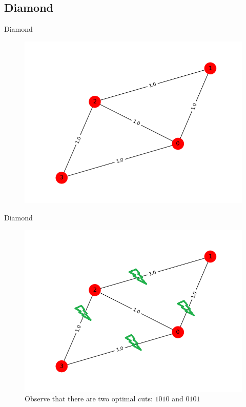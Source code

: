 \documentclass{beamer}
\begin{document}
\subsection{Diamond}
\begin{frame}{Diamond}
\begin{figure}
	\includegraphics[scale=0.6]{figures/diamond-graph.png}
\end{figure}
\end{frame}

\begin{frame}{Diamond}
\begin{figure}
	\includegraphics[scale=0.6]{figures/diamond-cut.png}
	\caption*{Observe that there are two optimal cuts: $1010$ and $0101$}
\end{figure}
\end{frame}
\end{document}
